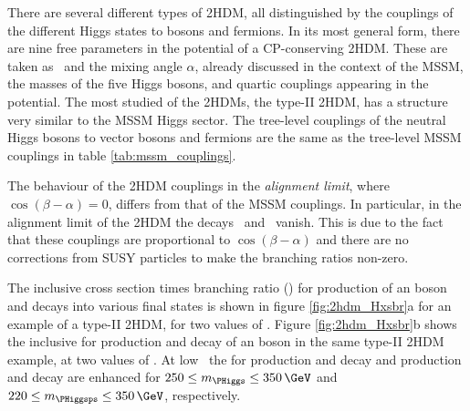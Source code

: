 There are several different types of \ac{2HDM}, all distinguished by the couplings
of the different Higgs states to bosons and fermions. In its most general
form, there are nine free parameters in the potential of a CP-conserving 2HDM. 
These are taken as \tanb~and the mixing angle $\alpha$, already discussed in 
the context of the \ac{MSSM}, the masses of the five Higgs bosons,
and quartic couplings appearing in the potential. The most studied of the
\ac{2HDM}s, the type-II \ac{2HDM}, has a structure very similar to 
the MSSM Higgs sector. The tree-level couplings of the neutral Higgs bosons to 
vector bosons and fermions are the same as the tree-level \ac{MSSM} couplings 
in table \ref{tab:mssm_couplings}. %

The behaviour of the \ac{2HDM} couplings in the \textit{alignment limit},
where $\cos{(\beta-\alpha)} = 0$, differs from that of the \ac{MSSM} couplings.
In particular, in the alignment limit of the \ac{2HDM} the decays \AtoZh~and \Htohh~vanish.
This is due to the fact that these couplings are
proportional to $\cos{(\beta-\alpha)}$ and there are no corrections
from \ac{SUSY} particles to make the branching ratios non-zero.

The inclusive cross section times branching ratio (\xsbr) for production of an \PHiggs boson 
and decays into various final states is shown in figure \ref{fig:2hdm_Hxsbr}a for an 
example of a type-II \ac{2HDM}, for two values of \tanb. Figure \ref{fig:2hdm_Hxsbr}b 
shows the inclusive \xsbr for production and decay
of an \PHiggsps boson in the same type-II \ac{2HDM} example, at two values of \tanb. At
low \tanb~the \xsbr for \Htohh production and decay and \AtoZh production
and decay are enhanced for $250\leq m_{\PHiggs}\leq 350\,\GeV$ and $220 \leq m_{\PHiggsps} \leq 350\,\GeV$, respectively.

